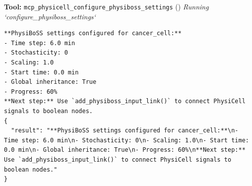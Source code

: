 \documentclass[11pt,a4paper]{article}
\begin{document}
\begin{toolokbox}
\textbf{Tool:} \texttt{mcp\_physicell\_configure\_physiboss\_settings} (\checkmark)
\textit{Running `configure\_physiboss\_settings`}
\begin{lstlisting}
**PhysiBoSS settings configured for cancer_cell:**
- Time step: 6.0 min
- Stochasticity: 0
- Scaling: 1.0
- Start time: 0.0 min
- Global inheritance: True
- Progress: 60%
**Next step:** Use `add_physiboss_input_link()` to connect PhysiCell signals to boolean nodes.
{
  "result": "**PhysiBoSS settings configured for cancer_cell:**\n- Time step: 6.0 min\n- Stochasticity: 0\n- Scaling: 1.0\n- Start time: 0.0 min\n- Global inheritance: True\n- Progress: 60%\n**Next step:** Use `add_physiboss_input_link()` to connect PhysiCell signals to boolean nodes."
}
\end{lstlisting}
\end{toolokbox}
\end{document}

